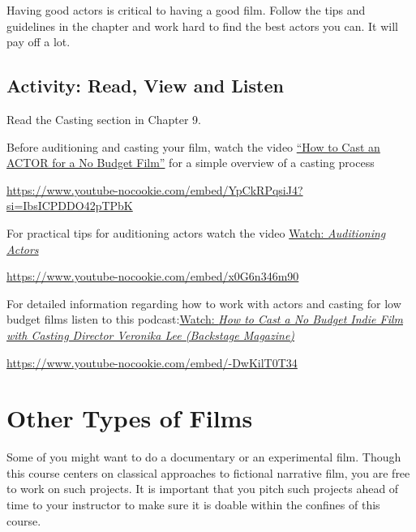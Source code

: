 \documentclass[
  letterpaper,
  DIV=11,
  numbers=noendperiod]{scrreprt}
\begin{document}
Having good actors is critical to having a good film. Follow the tips
and guidelines in the chapter and work hard to find the best actors you
can. It will pay off a lot.

\subsection*{Activity: Read, View and
Listen}\label{activity-read-view-and-listen}

\begin{tcolorbox}[enhanced jigsaw, opacityback=0, colframe=quarto-callout-note-color-frame, leftrule=.75mm, arc=.35mm, rightrule=.15mm, colbacktitle=quarto-callout-note-color!10!white, titlerule=0mm, colback=white, toprule=.15mm, bottomtitle=1mm, breakable, toptitle=1mm, title={Learning Activity}, coltitle=black, bottomrule=.15mm, left=2mm, opacitybacktitle=0.6]

Read the Casting section in Chapter 9.

Before auditioning and casting your film, watch the video
\href{https://www.youtube.com/watch?v=YpCkRPqsiJ4}{``How to Cast an
ACTOR for a No Budget Film''} for a simple overview of a casting process

\url{https://www.youtube-nocookie.com/embed/YpCkRPqsiJ4?si=IbsICPDDO42pTPbK}

For practical tips for auditioning actors watch the video
\href{https://www.youtube.com/watch?v=x0G6n346m90}{Watch:
\emph{Auditioning Actors}}

\url{https://www.youtube-nocookie.com/embed/x0G6n346m90}

For detailed information regarding how to work with actors and casting
for low budget films listen to this
podcast:\href{https://www.youtube.com/watch?v=-DwKilT0T34}{Watch:
\emph{How to Cast a No Budget Indie Film with Casting Director Veronika
Lee (Backstage Magazine)}}

\url{https://www.youtube-nocookie.com/embed/-DwKilT0T34}

\end{tcolorbox}

\section{Other Types of Films}\label{other-types-of-films}

Some of you might want to do a documentary or an experimental film.
Though this course centers on classical approaches to fictional
narrative film, you are free to work on such projects. It is important
that you pitch such projects ahead of time to your instructor to make
sure it is doable within the confines of this course.
\end{document}
